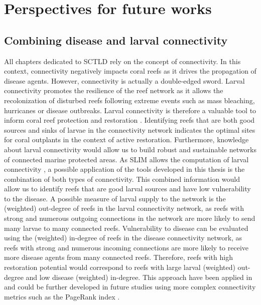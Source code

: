 \section{Perspectives for future works}

\subsection*{Combining disease and larval connectivity}
All chapters dedicated to SCTLD rely on the concept of connectivity. In this context, connectivity negatively impacts coral reefs as it drives the propagation of disease agents. However, connectivity is actually a double-edged sword. Larval connectivity promotes the resilience of the reef network as it allows the recolonization of disturbed reefs following extreme events such as mass bleaching, hurricanes or disease outbreaks. Larval connectivity is therefore a valuable tool to inform coral reef protection and restoration \citep{botsford2009connectivity,mumby2011reserve}. Identifying reefs that are both good sources and sinks of larvae in the connectivity network indicates the optimal sites for coral outplants in the context of active restoration. Furthermore, knowledge about larval connectivity would allow us to build robust and sustainable networks of connected marine protected areas. As SLIM allows the computation of larval connectivity \citep{thomas2014numerical,frys2020fine,figueiredo2021global}, a possible application of the tools developed in this thesis is the combination of both types of connectivity.  This combined information would allow us to identify reefs that are good larval sources and have low vulnerability to the disease. A possible measure of larval supply to the network is the (weighted) out-degree of reefs in the larval connectivity network, as reefs with strong and numerous outgoing connections in the network are more likely to send many larvae to many connected reefs. Vulnerability to disease can be evaluated using the (weighted) in-degree of reefs in the disease connectivity network, as reefs with strong and numerous incoming connections are more likely to receive more disease agents from many connected reefs. Therefore, reefs with high restoration potential would correspond to reefs with large larval (weighted) out-degree and low disease (weighted) in-degree. This approach have been applied in \cite{holstein2022} and could be further developed in future studies using more complex connectivity metrics such as the PageRank index \citep{frys2020fine}. 

